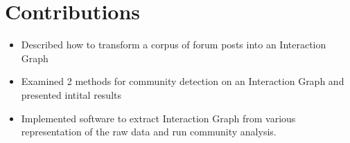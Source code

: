 \section{Contributions}


\begin{itemize}
  \item Described how to transform a corpus of forum posts into an Interaction Graph
  \item Examined 2 methods for community detection on an Interaction Graph and presented intital results
  \item Implemented software to extract Interaction Graph from various representation of the raw data and run community analysis.
\end{itemize}